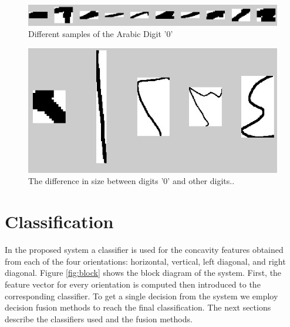 \documentclass[conference]{IEEEtran}
\begin{document}

 \begin{figure}
	\centering
		\includegraphics[scale=0.35]{Zero0}
	\caption[Arabic '0' Digits ] {Different samples of the Arabic Digit '0'}
	\label{fig:zerosize}
\end{figure}


 \begin{figure}
	\centering
		\includegraphics[scale=0.2]{Zero1}
	\caption[Arabic '0' Digits Versus Other digits] {The difference in size between digits '0' and other digits..}
	\label{fig:zeroVersusOther}
\end{figure}





\section {Classification}
\label{sec:classification}
In the proposed system a classifier is used for the concavity features obtained from each of the four orientations: horizontal, vertical, left diagonal, and right diagonal. Figure  \ref{fig:block} shows the block diagram of the system. First, the feature vector for every orientation is computed then introduced to the corresponding classifier. To get a single decision from the system we employ decision fusion methods to reach the final classification. The next sections describe the classifiers used and the fusion methods.
\end{document}

